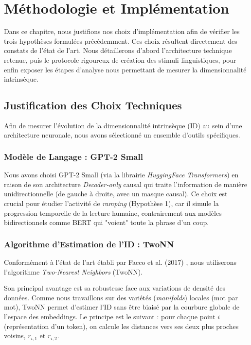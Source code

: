 \chapter{Méthodologie et Implémentation}
\label{chap:methode}

Dans ce chapitre, nous justifions nos choix d'implémentation afin de vérifier les trois hypothèses formulées précédemment. Ces choix résultent directement des constats de l'état de l'art. Nous détaillerons d'abord l'architecture technique retenue, puis le protocole rigoureux de création des stimuli linguistiques, pour enfin exposer les étapes d'analyse nous permettant de mesurer la dimensionnalité intrinsèque.

\section{Justification des Choix Techniques}

Afin de mesurer l'évolution de la dimensionnalité intrinsèque (ID) au sein d'une architecture neuronale, nous avons sélectionné un ensemble d'outils spécifiques.

\subsection{Modèle de Langage : GPT-2 Small}
Nous avons choisi GPT-2 Small (via la librairie \textit{HuggingFace Transformers}) en raison de son architecture \textit{Decoder-only} causal qui traite l'information de manière unidirectionnelle (de gauche à droite, avec un masque causal). Ce choix est crucial pour étudier l'activité de \textit{ramping} (Hypothèse 1), car il simule la progression temporelle de la lecture humaine, contrairement aux modèles bidirectionnels comme BERT qui "voient" toute la phrase d'un coup. 

\subsection{Algorithme d'Estimation de l'ID : TwoNN}
Conformément à l'état de l'art établi par Facco et al. (2017) \cite{facco2017estimating}, nous utiliserons l'algorithme \textit{Two-Nearest Neighbors} (TwoNN). 

Son principal avantage est sa robustesse face aux variations de densité des données. Comme nous travaillons sur des variétés (\textit{manifolds}) locales (mot par mot), TwoNN permet d'estimer l'ID sans être biaisé par la courbure globale de l'espace des embeddings.
Le principe est le suivant : pour chaque point $i$ (représentation d'un token), on calcule les distances vers ses deux plus proches voisins, $r_{i,1}$ et $r_{i,2}$.

